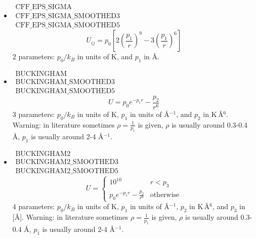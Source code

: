 \begin{itemize}
\item{$\begin{array}{l}\text{CFF\_EPS\_SIGMA}\\
      \text{CFF\_EPS\_SIGMA\_SMOOTHED3}\\
      \text{CFF\_EPS\_SIGMA\_SMOOTHED5}\end{array}$}\\
  \begin{equation}
    U_{ij}= 
      p_0 \left[2\left(\frac{p_1}{r}\right)^{9}-3\left(\frac{p_1}{r}\right)^6\right]
  \end{equation}
  2 parameters: $p_0/k_B$ in units of K, and $p_1$ in \AA.

\item{$\begin{array}{l}\text{BUCKINGHAM}\\
      \text{BUCKINGHAM\_SMOOTHED3}\\
      \text{BUCKINGHAM\_SMOOTHED5}\end{array}$}\\
  \begin{equation}
  U=
     p_0 e^{-p_1 r}-\frac{p_2}{r^{6}}
  \end{equation}
  3 parameters: $p_0/k_B$ in units of K, $p_1$ in units of \AA$^{-1}$, and $p_2$ in K\,\AA$^6$. Warning: in literature sometimes $\rho=\frac{1}{p_1}$ is given,
  $\rho$ is usually around 0.3-0.4 \AA, $p_1$ is usually around 2-4 \AA$^{-1}$.

\item{$\begin{array}{l}\text{BUCKINGHAM2}\\
      \text{BUCKINGHAM2\_SMOOTHED3}\\
      \text{BUCKINGHAM2\_SMOOTHED5}\end{array}$}\\
  \begin{equation}
  U=\begin{cases}
     10^{10}  & r<p_3\\
     p_0 e^{-p_1 r}-\frac{p_2}{r^{6}} & \text{otherwise}
    \end{cases}
  \end{equation}
  4 parameters: $p_0/k_B$ in units of K, $p_1$ in units of \AA$^{-1}$, $p_2$ in K\,\AA$^6$, and $p_3$ in [\AA].
  Warning: in literature sometimes $\rho=\frac{1}{p_1}$ is given,
  $\rho$ is usually around 0.3-0.4 \AA, $p_1$ is usually around 2-4 \AA$^{-1}$.


\end{itemize}
